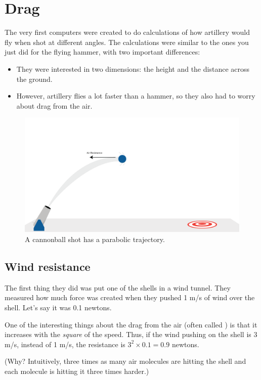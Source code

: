 \chapter{Drag}

The very first computers were created to do calculations of how
artillery would fly when shot at different angles. The calculations
were similar to the ones you just did for the flying
hammer, with two important differences:
\begin{itemize}
\item They were interested in two dimensions: the height and the distance across the ground.
\item However, artillery flies a lot faster than a hammer, so they also had to worry about drag from the air.
\end{itemize}
\begin{figure}[htbp]
    \centering
    \includegraphics[width=1\textwidth]{cannon.png}
    \caption{A cannonball shot has a parabolic trajectory.}
    \label{fig:cannon}
\end{figure}
\section{Wind resistance}
The first thing they did was put one of the shells in a wind tunnel.
They measured how much force was created when they pushed 1 m/s of
wind over the shell. Let's say it was 0.1 newtons.

One of the interesting things about the drag from the air (often
called ) is that it increases with the
\emph{square} of the speed. Thus, if the wind pushing on the shell is
3 m/s, instead of 1 m/s, the resistance is $3^2 \times 0.1 = 0.9$
newtons.

(Why? Intuitively, three times as many air molecules are hitting the
shell and each molecule is hitting it three times harder.)

